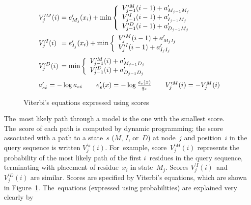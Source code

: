 \documentclass[]{jfp1}
\newcommand\figref[1]{Figure~\ref{fig:#1}}
\newcommand\figlabel[1]{\label{fig:#1}}
\begin{document}
\begin{figure}
\[
\begin{array}{l@{}c@{}l@{}}
V_{j}^{\prime M}(i) &{}={}& e^{\prime}_{M_{j}}(x_{i}) + \min \left\{
  \begin{array}{l@{}c@{}l}
  \vsum{V_{j-1}^{\prime M}(i - 1)} {a^{\prime}_{M_{j-1}M_{j}}}\\
  \vsum{V_{j-1}^{\prime I}(i - 1)} {a^{\prime}_{I_{j-1}M_{j}}}\\
  \vsum{V_{j-1}^{\prime D}(i - 1)} {a^{\prime}_{D_{j-1}M_{j}}}\\
  \end{array} \right.\\[\goo]
V_{j}^{\prime I}(i) &=& e^{\prime}_{I_{j}}(x_{i}) + \min \left\{
  \begin{array}{l@{}c@{}l}
  \vsum{V_{j}^{\prime M}(i - 1)} {a^{\prime}_{M_{j}I_{j}}}\\
  \vsum{V_{j}^{\prime I}(i - 1)} {a^{\prime}_{I_{j}I_{j}}}\\
  \end{array} \right.\\[\gum]
V_{j}^{\prime D}(i) &=& \min \left\{
  \begin{array}{l@{}c@{}l}
  \vsum{V_{j-1}^{\prime M}(i)} {a^{\prime}_{M_{j-1}D_{j}}}\\
  \vsum{V_{j-1}^{\prime D}(i)} {a^{\prime}_{D_{j-1}D_{j}}}\\
  \end{array} \right.\\[\gum]
%
\multicolumn3{l@{}}{%
  a'_{s \hat{s}} = - \log a_{s \hat{s}} 
\qquad
  e^{\prime}_{s}(x) = - \log\frac{e_{s}(x)}{q_{x}}
\qquad
  V_j^{\prime M}(i) = - V_j^{M}(i)
}
\\
\end{array}
\]

\caption{Viterbi's equations expressed using scores}
\figlabel{viterbi-transformed}
\end{figure}




\ifpagetuning\enlargethispage{1.2\baselineskip}\fi


The~most likely path through a model is the one with the
smallest score.
The~score of each path is computed by dynamic programming; the score associated with
a path to a state~$s$ ($M$, $I$, or~$D$) at node~$j$ and position~$i$ in
the query sequence is written $V_j^{\prime s}(i)$.
For~example, 
score~$V_j^{\prime M}(i)$ represents the probability of the most
likely path of the first $i$~residues in the query sequence,
terminating with placement of residue~$x_i$ in state~$M_j$.
Scores $V_j^{\prime I}(i)$~and~$V_j^{\prime D}(i)$ are similar.
Scores are specified by Viterbi's equations, which are shown
in \figref{viterbi-transformed}. 
The~equations (expressed using probabilities) are explained very clearly by
\citet[Chapter~5]{Durbin:1998wz}
\end{document}
